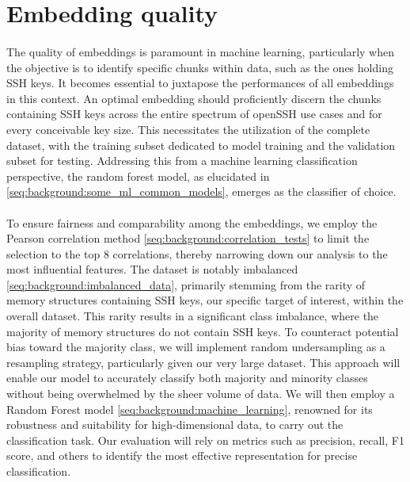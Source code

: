 \section{Embedding quality}\label{chap:embedding_quality}
\paragraph{}The quality of embeddings is paramount in machine learning, particularly when the objective is to identify specific \glspl{chunk} within data, such as the ones holding SSH keys. It becomes essential to juxtapose the performances of all embeddings in this context. An optimal embedding should proficiently discern the \glspl{chunk} containing SSH keys across the entire spectrum of openSSH use cases and for every conceivable key size. This necessitates the utilization of the complete dataset, with the training subset dedicated to model training and the validation subset for testing. Addressing this from a machine learning classification perspective, the random forest model, as elucidated in \ref{seq:background:some_ml_common_models}, emerges as the classifier of choice.

\paragraph{} To ensure fairness and comparability among the embeddings, we employ the Pearson correlation method \ref{seq:background:correlation_tests} to limit the selection to the top 8 correlations, thereby narrowing down our analysis to the most influential features. The dataset is notably imbalanced \ref{seq:background:imbalanced_data}, primarily stemming from the rarity of memory structures containing SSH keys, our specific target of interest, within the overall dataset. This rarity results in a significant class imbalance, where the majority of memory structures do not contain SSH keys. To counteract potential bias toward the majority class, we will implement random undersampling as a resampling strategy, particularly given our very large dataset. This approach will enable our model to accurately classify both majority and minority classes without being overwhelmed by the sheer volume of data. We will then employ a Random Forest model \ref{seq:background:machine_learning}, renowned for its robustness and suitability for high-dimensional data, to carry out the classification task. Our evaluation will rely on metrics such as precision, recall, F1 score, and others to identify the most effective representation for precise classification.


